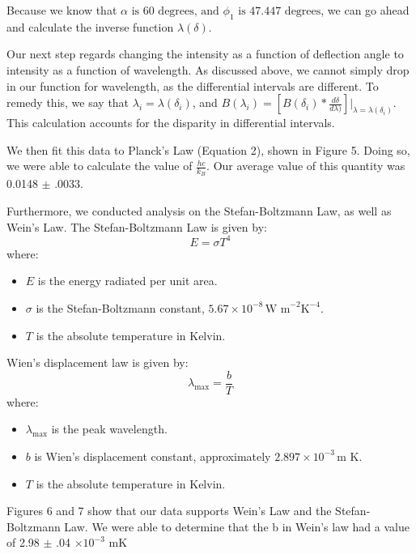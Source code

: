 \documentclass[10pt,letterpaper,onecolumn]{article}
\begin{document}
Because we know that $\alpha \text{ is 60 degrees, and } \phi_1 \text{ is 47.447 degrees}$,
we can go ahead and calculate the inverse function $\lambda(\delta)$.

Our next step regards changing the intensity as a function of deflection angle
to intensity as a function of wavelength. As discussed above, we cannot
simply drop in our function for wavelength, as the differential intervals are
different. To remedy this, we say that $\lambda_i = \lambda(\delta_i)$, and 
$B(\lambda_i) = [B(\delta_i) * \frac{d \delta}{ d \lambda)}]|_{\lambda = \lambda(\delta_i)}$.
This calculation accounts for the disparity in differential intervals. 

We then fit this data to Planck's Law (Equation 2), shown in Figure 5. 
Doing so, we were able to calculate the value of $\frac{hc}{k_B}$. Our average
value of this quantity was 0.0148 $\pm$ .0033. 

Furthermore, we conducted analysis on the Stefan-Boltzmann Law, as well as Wein's Law.
The Stefan-Boltzmann Law is given by:
\begin{equation}
E = \sigma T^4
\end{equation}
where:
\begin{itemize}
    \item \( E \) is the energy radiated per unit area.
    \item \( \sigma \) is the Stefan-Boltzmann constant, \( 5.67 \times 10^{-8} \, \text{W m}^{-2} \text{K}^{-4} \).
    \item \( T \) is the absolute temperature in Kelvin.
\end{itemize}

Wien's displacement law is given by:
\begin{equation}
\lambda_{\text{max}} = \frac{b}{T}
\end{equation}
where:
\begin{itemize}
    \item \( \lambda_{\text{max}} \) is the peak wavelength.
    \item \( b \) is Wien's displacement constant, approximately \( 2.897 \times 10^{-3} \, \text{m K} \).
    \item \( T \) is the absolute temperature in Kelvin.
\end{itemize}
Figures 6 and 7 show that our data supports Wein's Law and the Stefan-Boltzmann Law.
We were able to determine that the b in Wein's law had a value of 2.98 $\pm$ .04 $\times 10^{-3}$ mK
\end{document}
